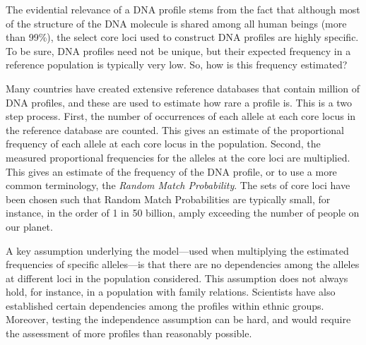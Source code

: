 \documentclass[10pt]{article}
\begin{document}
The evidential relevance of a DNA profile stems from the fact that although most of the structure of the DNA molecule 
is shared among all human beings (more than 99\%), the select core loci used to construct DNA profiles are highly specific. 
To be sure, DNA profiles need not be unique, but their expected frequency in a reference population is typically very low.
So, how is this frequency estimated?

Many countries have created extensive reference databases that contain million of DNA profiles,
and these
are used to estimate 
how rare a profile 
is.
This is a two step process. First, the number of occurrences of each allele at each core locus in the reference database are counted.
This gives an estimate of the proportional frequency of each allele at each core locus in the population. Second, the measured proportional frequencies for the alleles at the core loci are 
multiplied. This gives an estimate of the frequency of the DNA profile, or to use a more common terminology, 
the \textit{Random Match Probability}. %
The sets of core loci have been chosen such that Random Match Probabilities are typically small, for instance, in the order of 1 in 50 billion, amply exceeding the number of people on our planet. 

A key assumption underlying the model---used when multiplying the estimated frequencies of specific alleles---is that there are no 
dependencies among the alleles at different loci in the population considered. This assumption does not always hold, for instance, in a population 
with family relations. Scientists have also established certain dependencies among the profiles within ethnic groups. 
Moreover, testing the independence assumption can be hard, and would require the assessment of more profiles than reasonably possible. 
\end{document}

